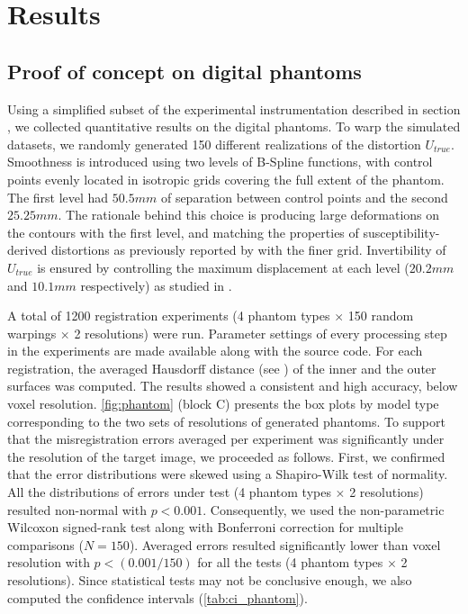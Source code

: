 \section*{Results}
\label{sec:results}

\subsection*{Proof of concept on digital phantoms}
\label{sec:results_phantom}
Using a simplified subset of the experimental instrumentation described in section
  , we collected quantitative results on the digital
  phantoms.
To warp the simulated datasets, we randomly generated 150 different realizations of
  the distortion $U_{true}$.
Smoothness is introduced using two levels of B-Spline functions, with control points evenly
  located in isotropic grids covering the full extent of the phantom.
The first level had $50.5mm$ of separation between control points and the second $25.25mm$.
The rationale behind this choice is producing large deformations on the contours with
  the first level, and matching the properties of susceptibility-derived distortions
  as previously reported by \cite{irfanoglu_susceptibility_2011} with the finer grid.
Invertibility of $U_{true}$ is ensured by controlling the maximum displacement at each
  level ($20.2mm$ and $10.1mm$ respectively) as studied in \citep{rueckert_diffeomorphic_2006}.

A total of 1200 registration experiments (4 phantom types $\times$ 150 random warpings
  $\times$ 2 resolutions) were run.
Parameter settings of every processing step in the experiments are made available along with
  the source code.
For each registration, the averaged Hausdorff distance (see )
  of the inner and the outer surfaces was computed.
The results showed a consistent and high accuracy, below voxel resolution.
\autoref{fig:phantom} (block C) presents the box plots by model type corresponding
  to the two sets of resolutions of generated phantoms.
To support that the misregistration errors averaged per experiment was significantly
  under the resolution of the target image, we proceeded as follows.
First, we confirmed that the error distributions were skewed using a Shapiro-Wilk test of
  normality.
All the distributions of errors under test (4 phantom types $\times$ 2 resolutions) resulted
  non-normal with $p<0.001$.
Consequently, we used the non-parametric Wilcoxon signed-rank test along with Bonferroni
  correction for multiple comparisons ($N=150$).
Averaged errors resulted significantly lower than voxel resolution with $p < (0.001 / 150)$
  for all the tests (4 phantom types $\times$ 2 resolutions).
Since statistical tests may not be conclusive enough, we also computed the confidence intervals
  (\autoref{tab:ci_phantom}).



